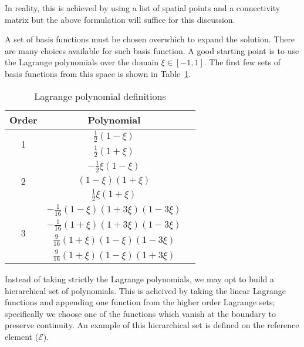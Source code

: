 \documentclass[11pt]{style/memo}
\begin{document}
In reality, this is achieved by using a list of spatial points and a connectivity matrix but the
above formulation will suffice for this discussion.

\hspace{1em} A set of basis functions must be chosen overwhich to expand the solution. There are many
choices available for such basis function. A good starting point is to use the Lagrange polynomials
over the domain $\xi \in [-1,1]$. The first few sets of basis functions from this space is shown in
Table~\ref{tab:lagrange}.

\begin{table}
\centering
\caption{Lagrange polynomial definitions}
\begin{tabular}{@{}ccc@{}}\toprule
\textbf{Order} & \textbf{Polynomial}\\ \midrule 
\multirow{2}{*}{1} & $\frac{1}{2}(1-\xi)$ \vspace{0.5em} \\
                   & $\frac{1}{2}(1+\xi)$ \vspace{0.5em} \\ \midrule
\multirow{3}{*}{2} & $-\frac{1}{2}\xi(1-\xi)$ \vspace{0.5em} \\
                   & $(1-\xi)(1+\xi)$ \vspace{0.5em} \\
                   & $\frac{1}{2}\xi(1+\xi)$ \vspace{0.5em} \\ \midrule
\multirow{4}{*}{3} & $-\frac{1}{16}(1-\xi)(1+3\xi)(1-3\xi)$ \vspace{0.5em} \\
                   & $-\frac{1}{16}(1+\xi)(1+3\xi)(1-3\xi)$ \vspace{0.5em} \\
                   & $\frac{9}{16}(1+\xi)(1-\xi)(1-3\xi)$ \vspace{0.5em} \\
                   & $\frac{9}{16}(1+\xi)(1-\xi)(1+3\xi)$ \vspace{0.5em} \\
\bottomrule
\end{tabular}\label{tab:lagrange}
\end{table}

\hspace{1em}Instead of taking strictly the Lagrange polynomials, we may opt to build a hierarchical set of polynomials.
This is acheived by taking the linear Lagrange functions and appending one function from the higher
order Lagrange sets; specifically we choose one of the functions which vanish at the boundary to
preserve continuity. An example of this hierarchical set is defined on the reference element ($\mathcal{E}$).
\end{document}
